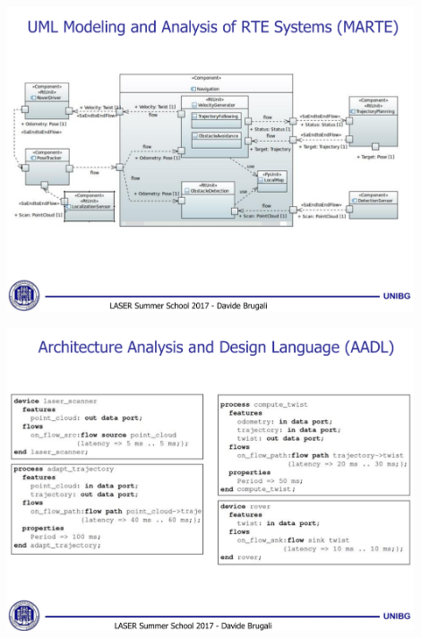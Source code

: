 \documentclass[xetex,mathserif,serif]{beamer}
\begin{document}
	\begin{frame}
		\begin{center}
			\includegraphics[width=0.9\textwidth]{brugali18.png}
		\end{center}
	\end{frame}

	\begin{frame}
		\begin{center}
			\includegraphics[width=0.9\textwidth]{brugali19.png}
		\end{center}
	\end{frame}
\end{document}
